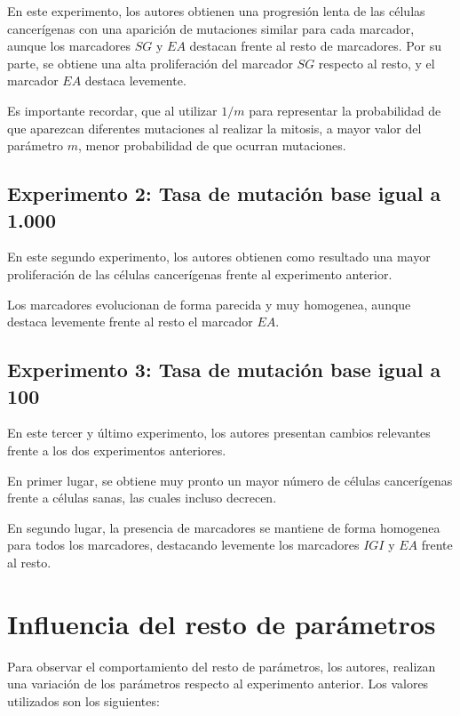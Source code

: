 En este experimento, los autores obtienen una progresión lenta de las células
cancerígenas con una aparición de mutaciones similar para cada marcador, aunque
los marcadores $SG$ y $EA$ destacan frente al resto de marcadores. Por su parte,
se obtiene una alta proliferación del marcador $SG$ respecto al resto, y el marcador
$EA$ destaca levemente.

Es importante recordar, que al utilizar $1/m$ para representar la probabilidad
de que aparezcan diferentes mutaciones al realizar la mitosis, a mayor valor
del parámetro $m$, menor probabilidad de que ocurran mutaciones.

\subsection{Experimento 2: Tasa de mutación base igual a 1.000}

En este segundo experimento, los autores obtienen como resultado una mayor proliferación
de las células cancerígenas frente al experimento anterior.

Los marcadores evolucionan de forma parecida y muy homogenea, aunque destaca levemente
frente al resto el marcador $EA$.

\subsection{Experimento 3: Tasa de mutación base igual a 100}

En este tercer y último experimento, los autores presentan cambios relevantes frente a los dos
experimentos anteriores.

En primer lugar, se obtiene muy pronto un mayor número de células cancerígenas
frente a células sanas, las cuales incluso decrecen.

En segundo lugar, la presencia de marcadores se mantiene de forma homogenea para todos
los marcadores, destacando levemente los marcadores $IGI$ y $EA$ frente al resto.

\section{Influencia del resto de parámetros}

Para observar el comportamiento del resto de parámetros, los autores, realizan una variación
de los parámetros respecto al experimento anterior. Los valores utilizados son los siguientes:

